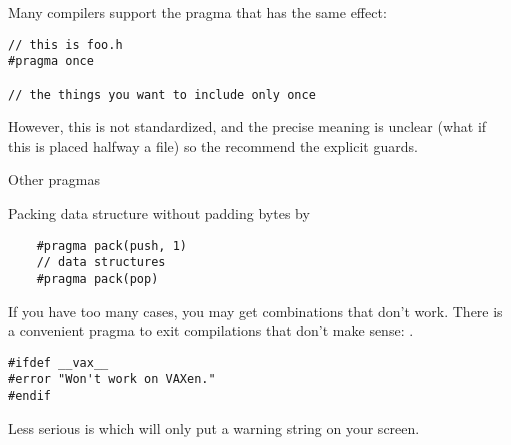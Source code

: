 Many compilers support the pragma
that has the same effect:
\begin{lstlisting}
// this is foo.h
#pragma once

// the things you want to include only once
\end{lstlisting}
However, this is not standardized, and the precise meaning is unclear
(what if this is placed halfway a file)
so the  recommend the explicit guards.

 {Other pragmas}

Packing data structure without padding bytes by 
  \begin{lstlisting}
    #pragma pack(push, 1)
    // data structures
    #pragma pack(pop)
  \end{lstlisting}

If you have too many  cases, you may
get combinations that don't work.
There is a convenient pragma to exit compilations that don't make sense:
.
\begin{verbatim}
#ifdef __vax__
#error "Won't work on VAXen."
#endif
\end{verbatim}

Less serious is  which will only
put a warning string on your screen.
